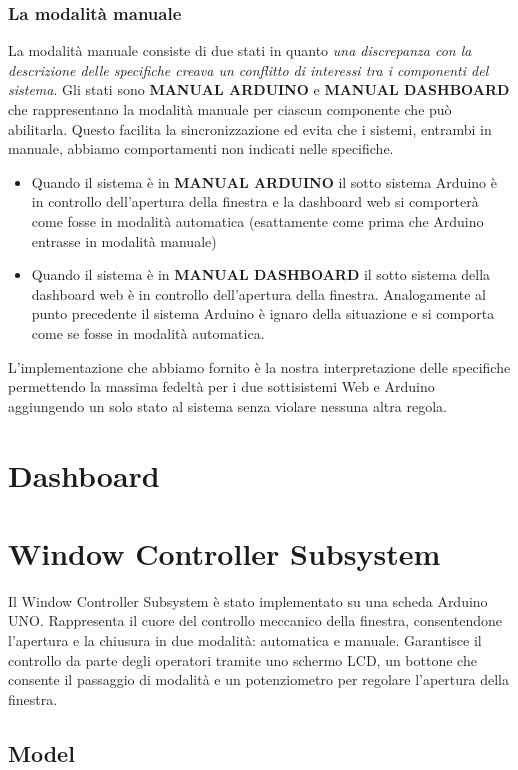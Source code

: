 \documentclass{report}
\begin{document}
\subsection{La modalità manuale}
La modalità manuale consiste di due stati in quanto \textit{una discrepanza con la descrizione delle specifiche creava un conflitto di interessi tra i componenti del sistema}. 
Gli stati sono \textbf{MANUAL ARDUINO} e \textbf{MANUAL DASHBOARD} che rappresentano la modalità manuale per ciascun componente che può abilitarla. Questo facilita la sincronizzazione ed evita che i sistemi, entrambi in manuale, abbiamo comportamenti non indicati nelle specifiche. \\
\begin{itemize}
    \item Quando il sistema è in \textbf{MANUAL ARDUINO} il sotto sistema Arduino è in controllo dell'apertura della finestra e la dashboard web si comporterà come fosse in modalità automatica (esattamente come prima  che Arduino entrasse in modalità manuale)
    \item Quando il sistema è in \textbf{MANUAL DASHBOARD} il sotto sistema della dashboard web è in controllo dell'apertura della finestra. Analogamente al punto precedente il sistema Arduino è ignaro della situazione e si comporta come se fosse in modalità automatica. 
\end{itemize}
L'implementazione che abbiamo fornito è la nostra interpretazione delle specifiche permettendo la massima fedeltà per i due sottisistemi Web e Arduino aggiungendo un solo stato al sistema senza violare nessuna altra regola. 
%
%
\chapter{Dashboard}


\chapter{Window Controller Subsystem}
\par {
Il Window Controller Subsystem è stato implementato su una scheda Arduino UNO. Rappresenta il cuore del controllo meccanico della finestra, consentendone l'apertura e la chiusura in due modalità: automatica e manuale. Garantisce il controllo da parte degli operatori tramite uno schermo LCD, un bottone che consente il passaggio di modalità e un potenziometro per regolare l'apertura della finestra.
}

\section{Model}
\end{document}
